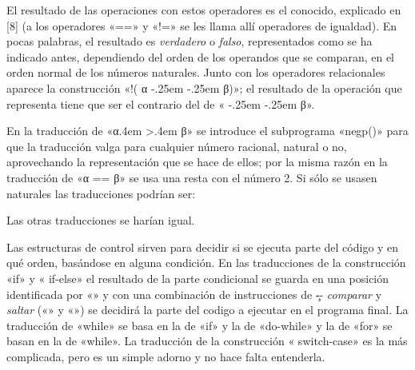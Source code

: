 El resultado de las operaciones con estos operadores es el conocido, explicado en [8] (a los
operadores «==» y «!=» se les llama allí operadores de igualdad). En pocas palabras, el resultado es
{\it verdadero} o {\it falso}, representados como se ha indicado antes, dependiendo del orden de los
operandos que se comparan, en el orden normal de los números naturales. Junto con los operadores
relacionales aparece la construcción «{\fcode!({\fgramatnoterm
α} \kern-.25em  \kern-.25em {\fgramatnoterm β})}»; el resultado de la operación
que representa tiene que ser el contrario del de «{ \kern-.25em  \kern-.25em {\fgramatnoterm β}}».

En la traducción de «{\fgramatnoterm α\kern.4em {\fcode >}\kern.4em \fgramatnoterm
β}»  se introduce el subprograma «{\fcode negp()}» para que la traducción valga para
cualquier número racional, natural o no, aprovechando la representación que se hace de ellos; por la
misma razón en la traducción de «{\fgramatnoterm α {\fcode ==} \fgramatnoterm β}» se usa una resta
con el número 2. Si sólo se usasen naturales las traducciones podrían ser:
\listraducciones
\noindent{}\par
\noindent{}\par
\noindent{}
\finlistatrad
Las otras traducciones se harían igual.

%
Las estructuras de control sirven para decidir si se ejecuta parte del código y en qué orden,
basándose en alguna condición. En las traducciones de la construcción «{\fcode if}» y «{\fcode
if-else}»  el resultado de la parte condicional se guarda en una posición identificada por
«» y con una combinación de instrucciones de \c-- {\it comparar} y {\it saltar}
(«\estrella» y «») se decidirá la parte del codigo a ejecutar en el programa final. La
traducción de «{\fcode while}» se basa en la de «{\fcode if}» y la de «{\fcode do-while}» y la de
«{\fcode for}» se basan en la de «{\fcode while}». La traducción de la construcción «{\fcode
switch-case}» es la más complicada, pero es un simple adorno y no hace falta entenderla.

